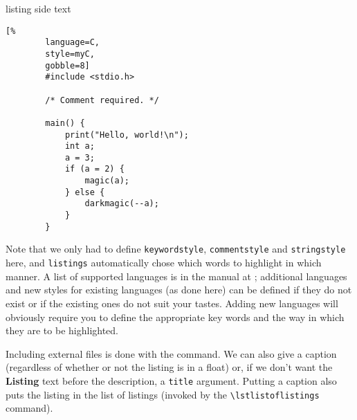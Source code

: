 \documentclass[article,a4paper,oneside,10pt]{memoir}
\newcommand\code[1]{\texttt{#1}}
\begin{document}
\begin{tcblisting}{listing side text}
    \begin{lstlisting}[%
        language=C,
        style=myC,
        gobble=8]
        #include <stdio.h>

        /* Comment required. */

        main() {
            print("Hello, world!\n");
            int a;
            a = 3;
            if (a = 2) {
                magic(a);
            } else {
                darkmagic(--a);
            }
        }
    \end{lstlisting}
\end{tcblisting}

Note that we  only had to define  \code{keywordstyle}, \code{commentstyle} and
\code{stringstyle} here,  and \code{listings} automatically chose  which words
to highlight in  which manner. A list of supported languages  is in the manual
at \cite{listings}; additional languages and new styles for existing languages
(as done here) can be defined if they  do not exist or if the existing ones do
not  suit your  tastes. Adding new  languages  will obviously  require you  to
define  the  appropriate key  words  and  the way  in  which  they are  to  be
highlighted.

Including external files is  done with the \verb|| command. We
can also  give a caption  (regardless of  whether or not  the listing is  in a
float) or, if we don't want  the \textbf{Listing} text before the description,
a \code{title} argument. Putting  a caption also puts the listing  in the list
of listings (invoked by the \verb|\lstlistoflistings| command).

\begin{tcblisting}{}
    
\end{tcblisting}

\vfill
\end{document}
